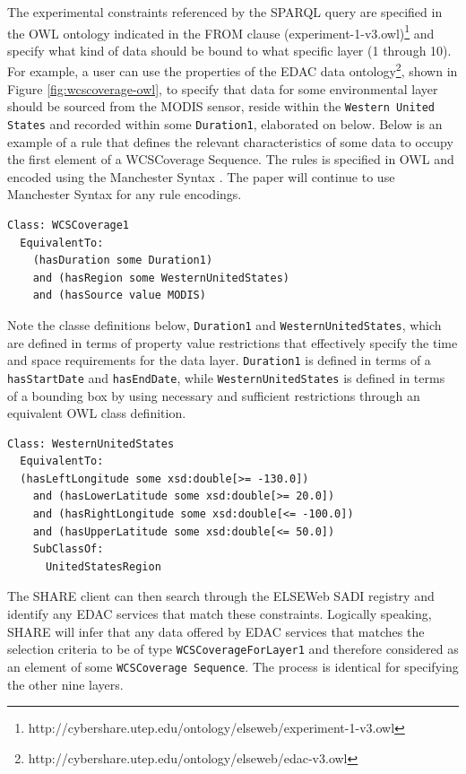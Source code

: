 \documentclass[letterpaper]{article}
\begin{document}
The experimental constraints referenced by the SPARQL query are specified in the OWL ontology indicated in the FROM clause (experiment-1-v3.owl)\footnote{http://cybershare.utep.edu/ontology/elseweb/experiment-1-v3.owl} and specify what kind of data should be bound to what specific layer (1 through 10). For example, a user can use the properties of the EDAC data ontology\footnote{http://cybershare.utep.edu/ontology/elseweb/edac-v3.owl}, shown in Figure \ref{fig:wcscoverage-owl}, to specify that data for some environmental layer should be sourced from the MODIS sensor, reside within the {\tt Western United States} and recorded within some {\tt Duration1}, elaborated on below. Below is an example of a rule that defines the relevant characteristics of some data to occupy the first element of a WCSCoverage Sequence. The rules is specified in OWL and encoded using the Manchester Syntax \cite{horridge2006manchester}. The paper will continue to use Manchester Syntax for any rule encodings.

\begin{lstlisting}[basicstyle=\footnotesize]
Class: WCSCoverage1
  EquivalentTo:
    (hasDuration some Duration1)
    and (hasRegion some WesternUnitedStates)
    and (hasSource value MODIS)
\end{lstlisting}

Note the classe definitions below, {\tt Duration1} and {\tt WesternUnitedStates}, which are defined in terms of property value restrictions that effectively specify the time and space requirements for the data layer. {\tt Duration1} is defined in terms of a {\tt hasStartDate} and {\tt hasEndDate}, while {\tt WesternUnitedStates} is defined in terms of a bounding box by using necessary and sufficient restrictions through an equivalent OWL class definition.

\begin{lstlisting}[basicstyle=\footnotesize]
Class: WesternUnitedStates
  EquivalentTo: 
  (hasLeftLongitude some xsd:double[>= -130.0])
    and (hasLowerLatitude some xsd:double[>= 20.0])     
    and (hasRightLongitude some xsd:double[<= -100.0])
    and (hasUpperLatitude some xsd:double[<= 50.0])
    SubClassOf: 
      UnitedStatesRegion
\end{lstlisting}


The SHARE client can then search through the ELSEWeb SADI registry and identify any EDAC services that match these constraints. Logically speaking, SHARE will infer that any data offered by EDAC services that matches the selection criteria to be of type {\tt WCSCoverageForLayer1} and therefore considered as an element of some {\tt WCSCoverage Sequence}. The process is identical for specifying the other nine layers.
\end{document}
